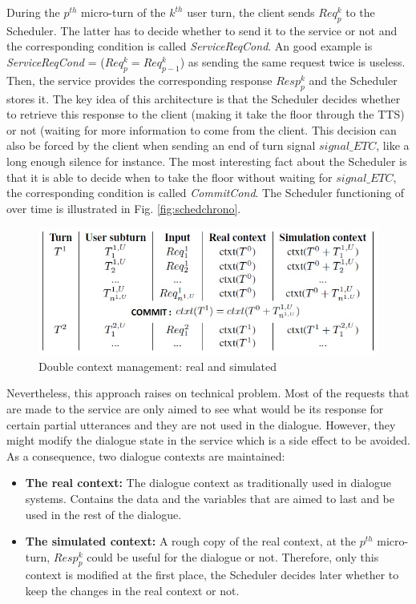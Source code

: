     	During the $p^{th}$ micro-turn of the $k^{th}$ user turn, the client sends $Req^k_p$ to the Scheduler. The latter has to decide whether to send it to the service or not and the corresponding condition is called \textit{ServiceReqCond}. An good example is \textit{ServiceReqCond} = ($Req^k_p = Req^k_{p-1}$) as sending the same request twice is useless. Then, the service provides the corresponding response $Resp^k_p$ and the Scheduler stores it. The key idea of this architecture is that the Scheduler decides whether to retrieve this response to the client (making it take the floor through the TTS) or not (waiting for more information to come from the client. This decision can also be forced by the client when sending an end of turn signal $signal\_ETC$, like a long enough silence for instance. The most interesting fact about the Scheduler is that it is able to decide when to take the floor without waiting for $signal\_ETC$, the corresponding condition is called \textit{CommitCond}. The Scheduler functioning of over time is illustrated in Fig. \ref{fig:schedchrono}.
        
        \begin{figure}[ht]
          \centering
          \includegraphics[scale=0.8]{figures/ContextChrono.jpg}
          \caption{Double context management: real and simulated}
          \label{fig:contextchrono}
        \end{figure}
        
        Nevertheless, this approach raises on technical problem. Most of the requests that are made to the service are only aimed to see what would be its response for certain partial utterances and they are not used in the dialogue. However, they might modify the dialogue state in the service which is a side effect to be avoided. As a consequence, two dialogue contexts are maintained:
        
        \begin{itemize}
           	\item \textbf{The real context:} The dialogue context as traditionally used in dialogue systems. Contains the data and the variables that are aimed to last and be used in the rest of the dialogue.
        	\item \textbf{The simulated context:} A rough copy of the real context, at the $p^{th}$ micro-turn, $Resp^k_p$ could be useful for the dialogue or not. Therefore, only this context is modified at the first place, the Scheduler decides later whether to keep the changes in the real context or not.
        \end{itemize}
        
